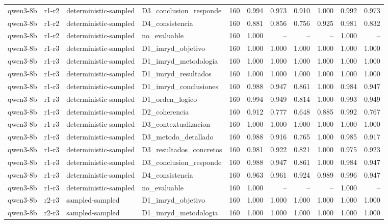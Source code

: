 \begin{table}
\begin{tabular}{llllrrrrrrr}
qwen3-8b & r1-r2 & deterministic-sampled & D3\_conclusion\_responde & 160 & 0.994 & 0.973 & 0.910 & 1.000 & 0.992 & 0.973 \\
qwen3-8b & r1-r2 & deterministic-sampled & D4\_consistencia & 160 & 0.881 & 0.856 & 0.756 & 0.925 & 0.981 & 0.832 \\
qwen3-8b & r1-r2 & deterministic-sampled & no\_evaluable & 160 & 1.000 & -- & -- & -- & 1.000 & -- \\
qwen3-8b & r1-r3 & deterministic-sampled & D1\_imryd\_objetivo & 160 & 1.000 & 1.000 & 1.000 & 1.000 & 1.000 & 1.000 \\
qwen3-8b & r1-r3 & deterministic-sampled & D1\_imryd\_metodologia & 160 & 1.000 & 1.000 & 1.000 & 1.000 & 1.000 & 1.000 \\
qwen3-8b & r1-r3 & deterministic-sampled & D1\_imryd\_resultados & 160 & 1.000 & 1.000 & 1.000 & 1.000 & 1.000 & 1.000 \\
qwen3-8b & r1-r3 & deterministic-sampled & D1\_imryd\_conclusiones & 160 & 0.988 & 0.947 & 0.861 & 1.000 & 0.984 & 0.947 \\
qwen3-8b & r1-r3 & deterministic-sampled & D1\_orden\_logico & 160 & 0.994 & 0.949 & 0.814 & 1.000 & 0.993 & 0.949 \\
qwen3-8b & r1-r3 & deterministic-sampled & D2\_coherencia & 160 & 0.912 & 0.777 & 0.648 & 0.885 & 0.992 & 0.767 \\
qwen3-8b & r1-r3 & deterministic-sampled & D3\_contextualizacion & 160 & 1.000 & 1.000 & 1.000 & 1.000 & 1.000 & 1.000 \\
qwen3-8b & r1-r3 & deterministic-sampled & D3\_metodo\_detallado & 160 & 0.988 & 0.916 & 0.765 & 1.000 & 0.985 & 0.917 \\
qwen3-8b & r1-r3 & deterministic-sampled & D3\_resultados\_concretos & 160 & 0.981 & 0.922 & 0.821 & 1.000 & 0.975 & 0.923 \\
qwen3-8b & r1-r3 & deterministic-sampled & D3\_conclusion\_responde & 160 & 0.988 & 0.947 & 0.861 & 1.000 & 0.984 & 0.947 \\
qwen3-8b & r1-r3 & deterministic-sampled & D4\_consistencia & 160 & 0.963 & 0.961 & 0.924 & 0.989 & 0.996 & 0.947 \\
qwen3-8b & r1-r3 & deterministic-sampled & no\_evaluable & 160 & 1.000 & -- & -- & -- & 1.000 & -- \\
qwen3-8b & r2-r3 & sampled-sampled & D1\_imryd\_objetivo & 160 & 1.000 & 1.000 & 1.000 & 1.000 & 1.000 & 1.000 \\
qwen3-8b & r2-r3 & sampled-sampled & D1\_imryd\_metodologia & 160 & 1.000 & 1.000 & 1.000 & 1.000 & 1.000 & 1.000 \\

\end{tabular}
\end{table}
